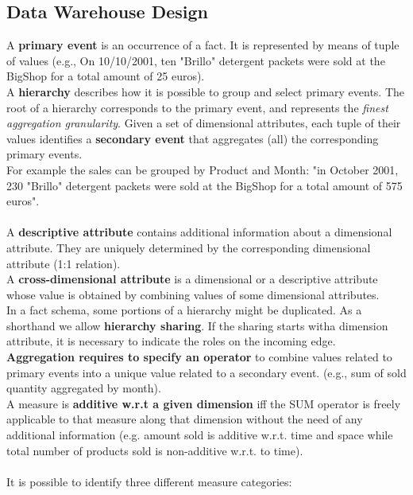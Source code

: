 \documentclass[10pt,a4paper]{article}
\newcommand{\nline}{\\~\\}
\begin{document}
\subsection{Data Warehouse Design}
A \textbf{primary event} is an occurrence of a fact. It is represented by means of tuple of values (e.g., On 10/10/2001, ten "Brillo" detergent packets were sold at the BigShop for a total amount of 25 euros). \\
A \textbf{hierarchy} describes how it is possible to group and select primary events. The root of a hierarchy corresponds to the primary event, and represents the \textit{finest aggregation granularity}.
Given a set of dimensional attributes, each tuple of their values identifies a \textbf{secondary event} that aggregates (all) the corresponding primary events. \\ For example the sales can be grouped by Product and Month: "in October 2001, 230 "Brillo" detergent packets were sold at the BigShop for a total amount of 575 euros". \nline
A \textbf{descriptive attribute} contains additional information about a dimensional attribute. They are uniquely determined by the corresponding dimensional attribute (1:1 relation). \\
A \textbf{cross-dimensional attribute} is a dimensional or a descriptive attribute whose value is obtained by combining values of some dimensional attributes. \\
In a fact schema, some portions of a hierarchy might be duplicated. As a shorthand we allow \textbf{hierarchy sharing}. If the sharing starts witha dimension attribute, it is necessary to indicate the roles on the incoming edge. \\
\textbf{Aggregation requires to specify an operator} to combine values related to primary events into a unique value related to a secondary event. (e.g., sum of sold quantity aggregated by month). \\
A measure is \textbf{additive w.r.t a given dimension} iff the SUM operator is freely applicable to that measure along that dimension without the need of any additional information (e.g. amount sold is additive w.r.t. time and space while total number of products sold is non-additive w.r.t. to time). \nline
It is possible to identify three different measure categories:
\end{document}

